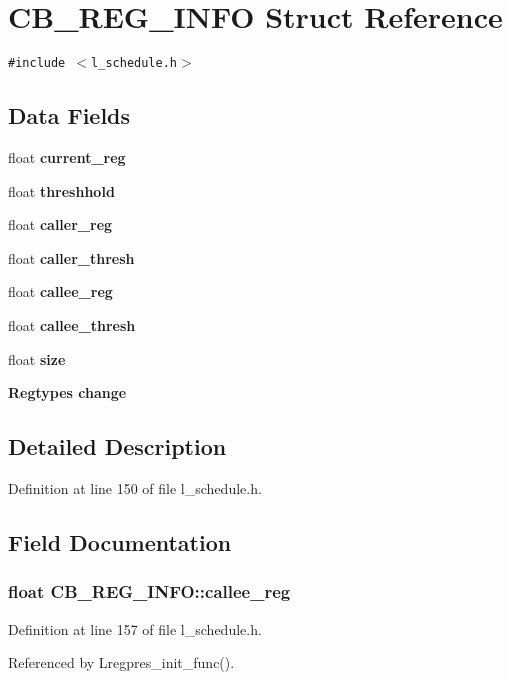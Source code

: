 \section{CB\_\-REG\_\-INFO Struct Reference}
\label{structCB__REG__INFO}
{\tt \#include $<$l\_\-schedule.h$>$}

\subsection*{Data Fields}
\begin{CompactItemize}
\item 
float \bf{current\_\-reg}
\item 
float \bf{threshhold}
\item 
float \bf{caller\_\-reg}
\item 
float \bf{caller\_\-thresh}
\item 
float \bf{callee\_\-reg}
\item 
float \bf{callee\_\-thresh}
\item 
float \bf{size}
\item 
\bf{Regtypes} \bf{change}
\end{CompactItemize}


\subsection{Detailed Description}




Definition at line 150 of file l\_\-schedule.h.

\subsection{Field Documentation}
\subsubsection{\setlength{\rightskip}{0pt plus 5cm}float \bf{CB\_\-REG\_\-INFO::callee\_\-reg}}\label{structCB__REG__INFO_fe48d7307161ffe9247dacaaafc40ffa}




Definition at line 157 of file l\_\-schedule.h.

Referenced by Lregpres\_\-init\_\-func().
